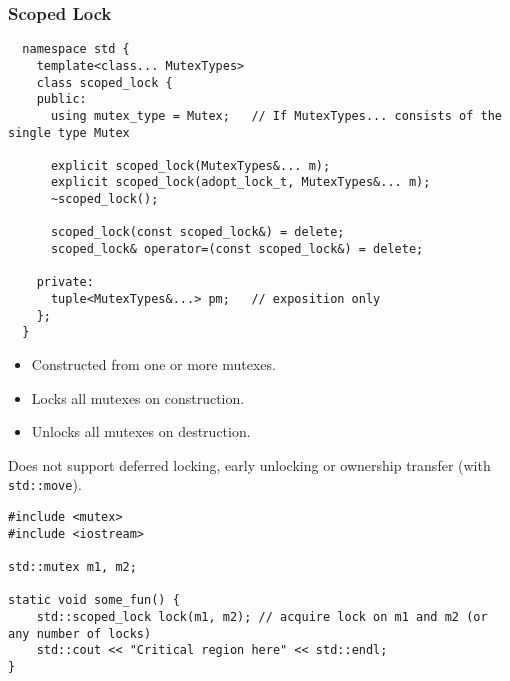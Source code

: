 \subsubsection{Scoped Lock}
\begin{verbatim}
  namespace std {
    template<class... MutexTypes>
    class scoped_lock {
    public:
      using mutex_type = Mutex;   // If MutexTypes... consists of the single type Mutex
    
      explicit scoped_lock(MutexTypes&... m);
      explicit scoped_lock(adopt_lock_t, MutexTypes&... m);
      ~scoped_lock();
    
      scoped_lock(const scoped_lock&) = delete;
      scoped_lock& operator=(const scoped_lock&) = delete;
    
    private:
      tuple<MutexTypes&...> pm;   // exposition only
    };
  }
\end{verbatim}
\begin{itemize}
	\item Constructed from one or more mutexes.
	\item Locks all mutexes on construction.
	\item Unlocks all mutexes on destruction.
\end{itemize}
\begin{consbox}
	Does not support deferred locking, early unlocking or ownership transfer (with \texttt{std::move}).
\end{consbox}

\begin{verbatim}
#include <mutex>
#include <iostream>

std::mutex m1, m2;

static void some_fun() {
    std::scoped_lock lock(m1, m2); // acquire lock on m1 and m2 (or any number of locks)
    std::cout << "Critical region here" << std::endl;
}
\end{verbatim}

